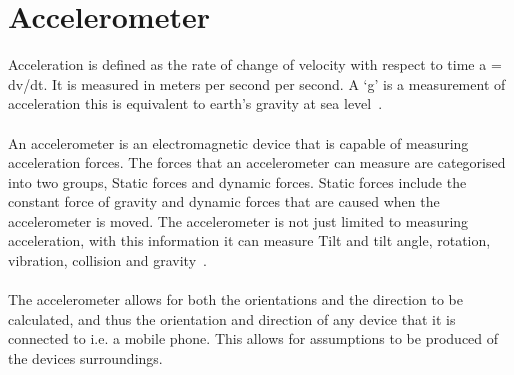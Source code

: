 \section{Accelerometer} %
\label{sec:section_accelerometer}
Acceleration is defined as the rate of change of velocity with respect to time a = dv/dt. It is measured in meters per second per second. A `g' is a measurement of acceleration this is equivalent to earth’s gravity at sea level~\cite{tiacc}.
\paragraph{}
An accelerometer is an electromagnetic device that is capable of measuring acceleration forces. The forces that an accelerometer can measure are categorised into two groups, Static forces and dynamic forces. Static forces include the constant force of gravity and dynamic forces that are caused when the accelerometer is moved. The accelerometer is not just limited to measuring acceleration, with this information it can measure Tilt and tilt angle, rotation, vibration, collision and gravity~\cite{lindsay2005parallax}.

\paragraph{} %
The accelerometer allows for both the orientations and the direction to be calculated, and thus the orientation and direction of any device that it is connected to i.e. a mobile phone.  This allows for assumptions to be produced of the devices surroundings.


